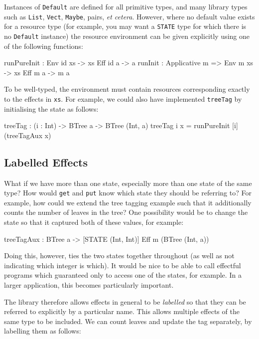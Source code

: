 \noindent
Instances of \texttt{Default} are defined for all primitive types, and many library types such as \texttt{List}, \texttt{Vect}, \texttt{Maybe}, pairs, \emph{et cetera}.
However, where no default value exists for a resource type (for example, you may want a \texttt{STATE} type for which there is no \texttt{Default} instance) the resource environment can be given explicitly using one of the following functions:

\begin{code}
runPureInit : Env id xs -> { xs } Eff id a -> a
runInit : Applicative m => Env m xs -> { xs } Eff m a -> m a
\end{code}

\noindent
To be well-typed, the environment must contain resources corresponding exactly to the effects in \texttt{xs}.
For example, we could also have implemented \texttt{treeTag} by initialising the state as follows:

\begin{code}
treeTag : (i : Int) -> BTree a -> BTree (Int, a)
treeTag i x = runPureInit [i] (treeTagAux x)
\end{code}

\subsection{Labelled Effects}

What if we have more than one state, especially more than one state of the same type?
How would \texttt{get} and \texttt{put} know which state they should be referring to?
For example, how could we extend the tree tagging example such that it additionally counts the number of leaves in the tree?
%
One possibility would be to change the state so that it captured both of these values, for example:

\begin{code}
treeTagAux : BTree a -> { [STATE (Int, Int)] } Eff m (BTree (Int, a))
\end{code}

\noindent
Doing this, however, ties the two states together throughout (as well as not indicating which integer is which).
It would be nice to be able to call effectful programs which guaranteed only to access one of the states, for example.
In a larger application, this becomes particularly important.

The \effects{} library therefore allows effects in general to be \emph{labelled} so that they can be referred to explicitly by a particular name.
This allows multiple effects of the same type to be included.
We can count leaves and update the tag separately, by labelling them as follows:

